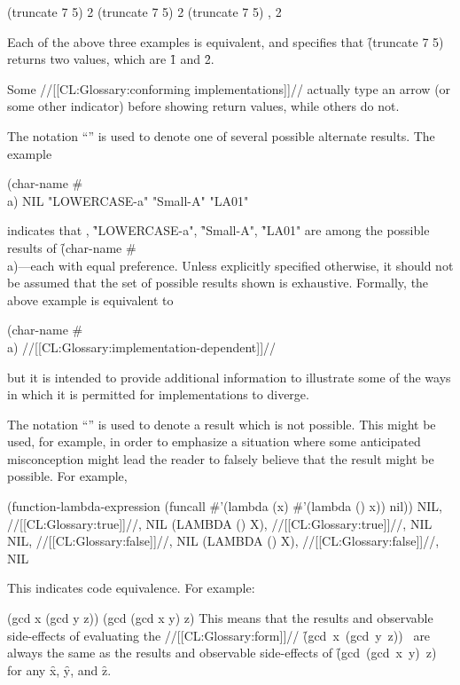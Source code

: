 \code
 (truncate 7 5)  2
 (truncate 7 5)  
   2
 (truncate 7 5) , 2 \endcode

Each of the above three examples is equivalent, and specifies that \f{(truncate 7 5)} returns two values, which are \f{1} and \f{2}.

Some //[[CL:Glossary:conforming implementations]]// actually type an arrow (or some other indicator) before showing return values, while others do not.

\itemitem{\OV}

The notation ``{\OV}'' is used to denote one of several possible alternate results.  The example

\code
 (char-name #\\a) \EV NIL \OV "LOWERCASE-a" \OV "Small-A" \OV "LA01" \endcode

indicates that \nil, \f{"LOWERCASE-a"}, \f{"Small-A"}, \f{"LA01"} are among the possible results of \f{(char-name \#\\a)}---each with equal preference. Unless explicitly specified otherwise, it should not be assumed that the set of possible  results shown is exhaustive. Formally, the above example is equivalent to

\code
 (char-name #\\a) \EV //[[CL:Glossary:implementation-dependent]]// \endcode

but it is intended to provide additional information to illustrate some of the ways in which it is permitted for implementations to diverge.

\itemitem{\NV}

The notation ``{\NV}'' is used to denote a result which is not possible. This might be used, for example, in order to emphasize a situation where some anticipated misconception might lead the reader to falsely believe that the result might be possible.  For example,

\code
 (function-lambda-expression 
    (funcall #'(lambda (x) #'(lambda () x)) nil)) \EV NIL, //[[CL:Glossary:true]]//, NIL \OV (LAMBDA () X), //[[CL:Glossary:true]]//, NIL \NV NIL, //[[CL:Glossary:false]]//, NIL \NV (LAMBDA () X), //[[CL:Glossary:false]]//, NIL \endcode

\itemitem{\EQ} 

This indicates code equivalence. For example:

\code
 (gcd x (gcd y z)) \EQ (gcd (gcd x y) z) \endcode This means that the results and observable side-effects of evaluating the //[[CL:Glossary:form]]// \hbox{\f{(gcd x (gcd y z))} } are always the same as the results and observable side-effects of \hbox{\f{(gcd (gcd x y) z)} } for any  \f{x}, \f{y}, and \f{z}.
                      

